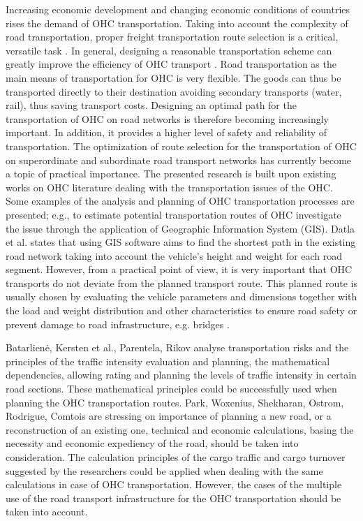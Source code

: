 %

Increasing economic development and changing economic conditions of countries rises the demand of OHC transportation. Taking into account the complexity of road transportation, proper freight transportation route selection is a critical, versatile task \cite{bazaras2013optimal, xu2001methodology, sivilevicius2007dynamics}. In general, designing a reasonable transportation scheme can greatly improve the efficiency of OHC transport \cite{meng2015optimized}. Road transportation as the main means of transportation for OHC is very flexible. The goods can thus be transported directly to their destination avoiding secondary transports (water, rail), thus saving transport costs. Designing an optimal path for the transportation of OHC on road networks is therefore becoming increasingly important. In addition, it provides a higher level of safety and reliability of transportation. The optimization of route selection for the transportation of OHC on superordinate and subordinate road transport networks has currently become a topic of practical importance\cite{geisberger2011efficient}. 
The presented research is built upon existing works on OHC literature dealing with the transportation issues of the OHC. Some examples of the analysis and planning of OHC transportation processes are presented; e.g., to estimate potential transportation routes of OHC \cite{durham2002gis} investigate the issue through the application of Geographic Information System (GIS). Datla et al. \cite{datla2004gis} states that using GIS software aims to find the shortest path in the existing road network taking into account the vehicle’s height and weight for each road segment. However, from a practical point of view, it is very important that OHC transports do not deviate from the planned transport route. This planned route is usually chosen by evaluating the vehicle parameters and dimensions together with the load and weight distribution and other characteristics to ensure road safety or prevent damage to road infrastructure, e.g. bridges \cite{ecmt2006improving, vaitkus2016effect, kombe2017modelling, pauer2017development}.

 Batarlienė, Kersten et al., Parentela, Rikov analyse transportation risks and the principles of the traffic intensity evaluation and planning, the mathematical dependencies, allowing rating and planning the levels of traffic intensity in certain road sections. These mathematical principles could be successfully used when planning the OHC transportation routes. Park, Woxenius, Shekharan, Ostrom, Rodrigue, Comtois are stressing on importance of planning a new road, or a reconstruction of an existing one, technical and economic calculations, basing the necessity and economic expediency of the road, should be taken into consideration. The calculation principles of the cargo traffic and cargo turnover suggested by the researchers could be applied when dealing with the same calculations in case of OHC  transportation. However, the cases of the multiple use of the road transport infrastructure for the OHC transportation should be taken into account. 


